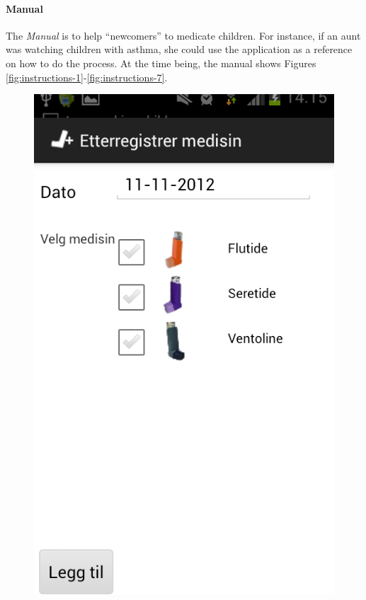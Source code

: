 \paragraph{Manual}
The \emph{Manual} is to help ``newcomers'' to medicate children. For instance, if an aunt was watching children with asthma, she could use the application as a reference on how to do the process. At the time being, the manual shows Figures \ref{fig:instructions-1}-\ref{fig:instructions-7}. 
        
\begin{figure}[H]
	\begin{minipage}[b]{0.3\linewidth}
		\centering
		\includegraphics[width=0.20\paperwidth]{Pictures/app-screenshots/register_treatment.png}

\end{minipage}
\end{figure}

